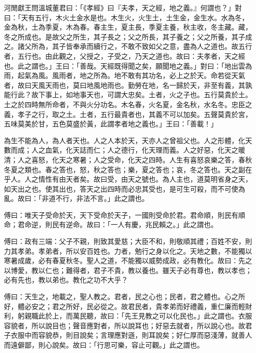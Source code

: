 
河閒獻王問溫城董君曰：「《孝經》曰『夫孝，天之經，地之義。』何謂也？」對曰：「天有五行，木火土金水是也。木生火，火生土，土生金，金生水。水為冬，金為秋，土為季夏，木為春。春主生，夏主長，季夏主養，秋主收，冬主藏。藏，冬之所成也。是故父之所生，其子長之；父之所長，其子養之；父之所養，其子成之。諸父所為，其子皆奉承而續行之，不敢不致如父之意，盡為人之道也。故五行者，五行也。由此觀之，父授之，子受之，乃天之道也。故曰：夫孝者，天之經也。此之謂也。」王曰：「善哉。天經既得聞之矣，願聞地之義。」對曰：「地出雲為雨，起氣為風。風雨者，地之所為。地不敢有其功名，必上之於天。命若從天氣者，故曰天風天雨也，莫曰地風地雨也。勤勞在地，名一歸於天，非至有義，其孰能行此？故下事上，如地事天也，可謂大忠矣。土者，火之子也。五行莫貴於土。土之於四時無所命者，不與火分功名。木名春，火名夏，金名秋，水名冬。忠臣之義，孝子之行，取之土。土者，五行最貴者也，其義不可以加矣。五聲莫貴於宮，五味莫美於甘，五色莫盛於黃，此謂孝者地之義也。」王曰：「善載！」

為生不能為人，為人者天也。人之人本於天，天亦人之曾祖父也。人之形體，化天數而成；人之血氣，化天誌而仁；人之德行，化天理而義。人之好惡，化天之暖清；人之喜怒，化天之寒暑；人之受命，化天之四時。人生有喜怒哀樂之答，春秋冬夏之類也。春之答也，怒，秋之答也；樂，夏之答也；哀，冬之答也。天之副在乎人。人之情性有由天者矣。故曰受，由天之號也。為人主也，道莫明省身之天，如天出之也。使其出也，答天之出四時而必忠其受也，是可生可殺，而不可使為亂。故曰：「非道不行，非法不言。」此之謂也。


傅曰：唯天子受命於天，天下受命於天子，一國則受命於君。君命順，則民有順命；君命逆，則民有逆命。故曰：「一人有慶，兆民賴之。」此之謂也。


傅曰：政有三端：父子不親，則致其愛慈；大臣不和，則敬順其禮；百姓不安，則力其孝弟。孝弟者，所以安百姓也。力者，勉行之身以化之。天地之數，不能獨以寒暑成歲，必有春夏秋冬。聖人之道，不能獨以威勢成政，必有教化。故曰：先之以博愛，教以仁也；難得者，君子不貴，教以養也。雖天子必有尊也，教以孝也；必有先也，教以弟也。教化之功不大乎？


傅曰：天生之，地載之，聖人教之。君者，民之心也；民者，君之體也。心之所好，體必安之；君之所好，民必從之。故君民者，貴孝弟而好禮義，重仁廉而輕財利，躬親職此於上，而萬民聽，故曰：「先王見教之可以化民也。」此之謂也。衣服容貌者，所以說目也；聲音應對者，所以說耳也；好惡去就者，所以說心也。故君子衣服中而容貌恭，則目說矣；言理應對遜，則耳說矣；好仁厚而惡淺薄，就善人而遠僻鄙，則心說矣。故曰：「行思可樂，容止可觀。」此之謂也。



